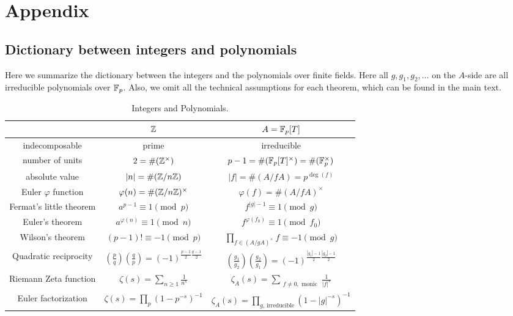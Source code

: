 \appendix
\section{Appendix}


\subsection{Dictionary between integers and polynomials}
\label{subsec:dictionary}

Here we summarize the dictionary between the integers and the polynomials over finite fields.
Here all $g, g_1, g_2, \dots$ on the $A$-side are all irreducible polynomials over $\mathbb{F}_p$.
Also, we omit all the technical assumptions for each theorem, which can be found in the main text.

\begin{table}[h]
    \begin{center}
        \begin{tabular}{c|c|c}
            \toprule
            & $\mathbb{Z}$ & $A = \mathbb{F}_p[T]$ \\
            \midrule
            indecomposable & prime & irreducible \\
            number of units &$2 = \#(\mathbb{Z}^\times)$ & $p - 1 = \# (\mathbb{F}_p[T]^\times) = \# (\mathbb{F}_p^\times)$ \\
            absolute value & $|n| = \# (\mathbb{Z} / n\mathbb{Z})$ & $|f| = \# (A / f A) = p^{\deg (f)}$ \\
            Euler $\varphi$ function & $\varphi(n) = \# (\mathbb{Z} / n \mathbb{Z})^\times$ & $\varphi(f) = \# (A / fA)^\times$ \\
            Fermat's little theorem & $a^{p-1} \equiv 1 \pmod{p}$ & $f^{|g| - 1} \equiv 1 \pmod{g}$ \\
            Euler's theorem & $a^{\varphi(n)} \equiv 1 \pmod{n}$ & $f^{\varphi(f_0)} \equiv 1 \pmod{f_0}$ \\
            Wilson's theorem & $(p-1)! \equiv -1 \pmod{p}$ & $\prod_{f \in (A / g A)^\times} f \equiv -1 \pmod{g}$ \\
            Quadratic reciprocity & $\left(\frac{p}{q}\right)\left(\frac{q}{p}\right) = (-1)^{\frac{p-1}{2}\frac{q-1}{2}}$ & $\left(\frac{g_1}{g_2}\right)\left(\frac{g_2}{g_1}\right) = (-1)^{\frac{|g_1| - 1}{2}\frac{|g_2| - 1}{2}}$\\
            Riemann Zeta function & $\zeta(s) = \sum_{n \ge 1}\frac{1}{n^s}$ & $\zeta_{A}(s) = \sum_{\substack{f \ne 0, \text{ monic}}} \frac{1}{|f|^s}$ \\
            Euler factorization & $\zeta(s) = \prod_{p} (1 - p^{-s})^{-1}$ & $\zeta_A(s) = \prod_{g,\,\text{irreducible}} (1 - |g|^{-s})^{-1}$ \\
            \bottomrule
        \end{tabular}
        \caption{Integers and Polynomials.}
        \label{tab:dictionary}
    \end{center}
\end{table}

